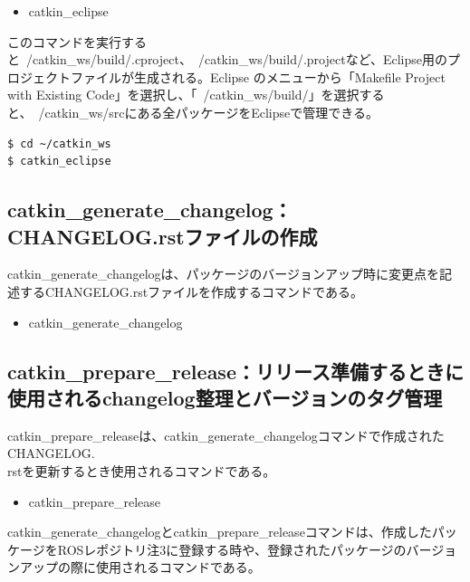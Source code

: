 \begin{itemize}
\item catkin\_eclipse
\end{itemize}

このコマンドを実行すると~/catkin\_ws/build/.cproject、~/catkin\_ws/build/.projectなど、Eclipse用のプロジェクトファイルが生成される。Eclipse のメニューから「Makefile Project with Existing Code」を選択し、「~/catkin\_ws/build/」を選択すると、~/catkin\_ws/srcにある全パッケージをEclipseで管理できる。

\begin{lstlisting}[language=ROS]
$ cd ~/catkin_ws
$ catkin_eclipse
\end{lstlisting}

\subsection{catkin\_generate\_changelog：CHANGELOG.rstファイルの作成}

catkin\_generate\_changelogは、パッケージのバージョンアップ時に変更点を記述するCHANGELOG.rstファイルを作成するコマンドである。

\begin{itemize}
\item catkin\_generate\_changelog
\end{itemize}

\subsection{catkin\_prepare\_release：リリース準備するときに使用されるchangelog整理とバージョンのタグ管理}

catkin\_prepare\_releaseは、catkin\_generate\_changelogコマンドで作成されたCHANGELOG.\\rstを更新するとき使用されるコマンドである。

\begin{itemize}
\item catkin\_prepare\_release
\end{itemize}

catkin\_generate\_changelogとcatkin\_prepare\_releaseコマンドは、作成したパッケージをROSレポジトリ注3に登録する時や、登録されたパッケージのバージョンアップの際に使用されるコマンドである。

